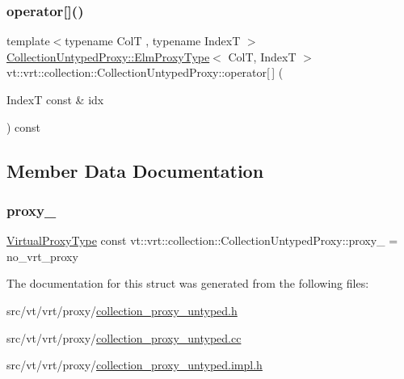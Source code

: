 \mbox{\label{structvt_1_1vrt_1_1collection_1_1_collection_untyped_proxy_a04bd48b1cc06e903b520d91d09b01bb3}} 
\subsubsection{\texorpdfstring{operator[]()}{operator[]()}}
{\footnotesize\ttfamily template$<$typename ColT , typename IndexT $>$ \\
\hyperlink{structvt_1_1vrt_1_1collection_1_1_collection_untyped_proxy_abf73984f3a31218515f9f4806f41cef5}{Collection\+Untyped\+Proxy\+::\+Elm\+Proxy\+Type}$<$ ColT, IndexT $>$ vt\+::vrt\+::collection\+::\+Collection\+Untyped\+Proxy\+::operator\mbox{[}$\,$\mbox{]} (\begin{DoxyParamCaption}\item[{IndexT const \&}]{idx }\end{DoxyParamCaption}) const}



\subsection{Member Data Documentation}
\mbox{\label{structvt_1_1vrt_1_1collection_1_1_collection_untyped_proxy_ae76427f1f00db9e26a385c245dc9189d}} 
\subsubsection{\texorpdfstring{proxy\+\_\+}{proxy\_}}
{\footnotesize\ttfamily \hyperlink{namespacevt_a1b417dd5d684f045bb58a0ede70045ac}{Virtual\+Proxy\+Type} const vt\+::vrt\+::collection\+::\+Collection\+Untyped\+Proxy\+::proxy\+\_\+ = no\+\_\+vrt\+\_\+proxy\hspace{0.3cm}{\ttfamily [private]}}



The documentation for this struct was generated from the following files\+:\begin{DoxyCompactItemize}
\item 
src/vt/vrt/proxy/\hyperlink{collection__proxy__untyped_8h}{collection\+\_\+proxy\+\_\+untyped.\+h}\item 
src/vt/vrt/proxy/\hyperlink{collection__proxy__untyped_8cc}{collection\+\_\+proxy\+\_\+untyped.\+cc}\item 
src/vt/vrt/proxy/\hyperlink{collection__proxy__untyped_8impl_8h}{collection\+\_\+proxy\+\_\+untyped.\+impl.\+h}\end{DoxyCompactItemize}
